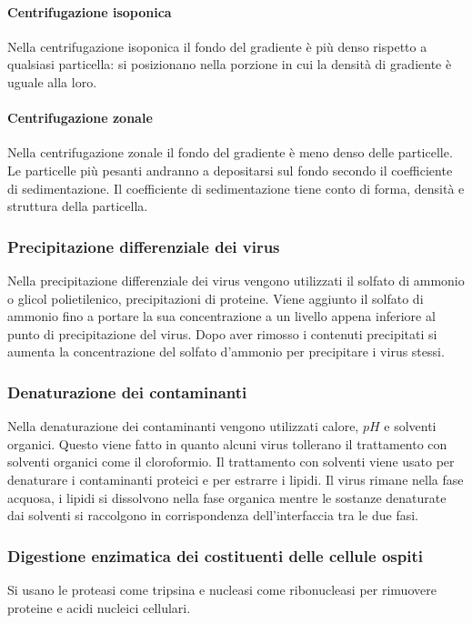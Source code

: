 		\paragraph{Centrifugazione isoponica}
		Nella centrifugazione isoponica il fondo del gradiente \`e pi\`u denso rispetto a qualsiasi particella: si posizionano nella porzione in cui la densit\`a di gradiente \`e uguale alla loro.

		\paragraph{Centrifugazione zonale}
		Nella centrifugazione zonale il fondo del gradiente \`e meno denso delle particelle.
		Le particelle pi\`u pesanti andranno a depositarsi sul fondo secondo il coefficiente di sedimentazione.
		Il coefficiente di sedimentazione tiene conto di forma, densit\`a e struttura della particella.

	\subsubsection{Precipitazione differenziale dei virus}
	Nella precipitazione differenziale dei virus vengono utilizzati il solfato di ammonio o glicol polietilenico, precipitazioni di proteine.
	Viene aggiunto il solfato di ammonio fino a portare la sua concentrazione a un livello appena inferiore al punto di precipitazione del virus. 
	Dopo aver rimosso i contenuti precipitati si aumenta la concentrazione del solfato d'ammonio per precipitare i virus stessi. 

	\subsubsection{Denaturazione dei contaminanti}
	Nella denaturazione dei contaminanti vengono utilizzati calore, $pH$ e solventi organici. 
	Questo viene fatto in quanto alcuni virus tollerano il trattamento con solventi organici come il cloroformio.
	Il trattamento con solventi viene usato per denaturare i contaminanti proteici e per estrarre i lipidi. 
	Il virus rimane nella fase acquosa, i lipidi si dissolvono nella fase organica mentre le sostanze denaturate dai solventi si raccolgono in corrispondenza dell'interfaccia tra le due fasi. 

	\subsubsection{Digestione enzimatica dei costituenti delle cellule ospiti}
	Si usano le proteasi come tripsina e nucleasi come ribonucleasi per rimuovere proteine e acidi nucleici cellulari. 

